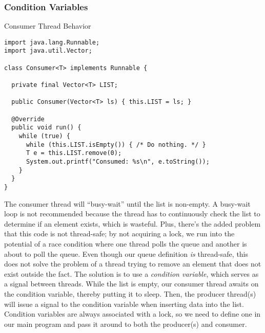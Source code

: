 \subsubsection*{Condition Variables}


\begin{cl}{Consumer Thread Behavior}
\begin{lstlisting}[language=MyJava]
import java.lang.Runnable;
import java.util.Vector;

class Consumer<T> implements Runnable {

  private final Vector<T> LIST;

  public Consumer(Vector<T> ls) { this.LIST = ls; }

  @Override
  public void run() {
    while (true) {
      while (this.LIST.isEmpty()) { /* Do nothing. */ }
      T e = this.LIST.remove(0);
      System.out.printf("Consumed: %s\n", e.toString());
    }
  }
}
\end{lstlisting}
\end{cl}

The consumer thread will ``busy-wait'' until the list is non-empty. A busy-wait loop is not recommended because the thread has to continuously check the list to determine if an element exists, which is wasteful. Plus, there's the added problem that this code is not thread-safe; by not acquiring a lock, we run into the potential of a race condition where one thread polls the queue and another is about to poll the queue. Even though our queue definition \textit{is} thread-safe, this does not solve the problem of a thread trying to remove an element that does not exist outside the fact. The solution is to use a \textit{condition variable}, which serves as a signal between threads. While the list is empty, our consumer thread awaits on the condition variable, thereby putting it to sleep. Then, the producer thread(s) will issue a signal to the condition variable when inserting data into the list. Condition variables are always associated with a lock, so we need to define one in our main program and pass it around to both the producer(s) and consumer. 


